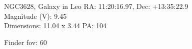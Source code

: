 \begin{block}{NGC3628, Galaxy in Leo}
    RA: 11:20:16.97, Dec: +13:35:22.9 \\ 
    Magnitude (V): 9.45 \\ 
    Dimensions: 11.04 x 3.44 PA: 104 

    Finder fov: 60 
\end{block}